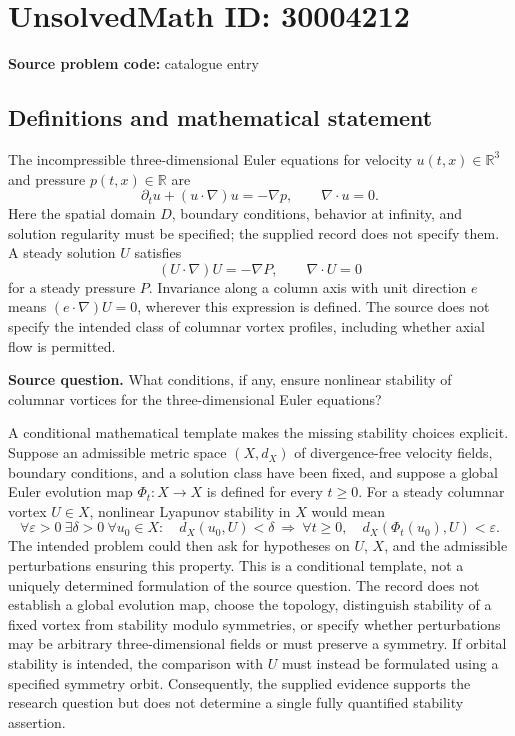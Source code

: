 \documentclass[11pt]{article}
\newcommand{\R}{\mathbb{R}}
\begin{document}
\section*{UnsolvedMath ID: 30004212}
\textbf{Source problem code:} catalogue entry
\subsection{Definitions and mathematical statement}
The incompressible three-dimensional Euler equations for velocity \(u(t,x)\in\R^3\) and pressure \(p(t,x)\in\R\) are
\[
\partial_tu+(u\cdot\nabla)u=-\nabla p,\qquad \nabla\cdot u=0.
\]
Here the spatial domain \(D\), boundary conditions, behavior at infinity, and solution regularity must be specified; the supplied record does not specify them. A steady solution \(U\) satisfies
\[
(U\cdot\nabla)U=-\nabla P,\qquad \nabla\cdot U=0
\]
for a steady pressure \(P\). Invariance along a column axis with unit direction \(e\) means \((e\cdot\nabla)U=0\), wherever this expression is defined. The source does not specify the intended class of columnar vortex profiles, including whether axial flow is permitted.

\textbf{Source question.} What conditions, if any, ensure nonlinear stability of columnar vortices for the three-dimensional Euler equations?

A conditional mathematical template makes the missing stability choices explicit. Suppose an admissible metric space \((X,d_X)\) of divergence-free velocity fields, boundary conditions, and a solution class have been fixed, and suppose a global Euler evolution map \(\Phi_t\colon X\to X\) is defined for every \(t\geq0\). For a steady columnar vortex \(U\in X\), nonlinear Lyapunov stability in \(X\) would mean
\[
\forall\varepsilon>0\ \exists\delta>0\ \forall u_0\in X:\quad
 d_X(u_0,U)<\delta
 \ \Longrightarrow\
 \forall t\geq0,\quad d_X(\Phi_t(u_0),U)<\varepsilon.
\]
The intended problem could then ask for hypotheses on \(U\), \(X\), and the admissible perturbations ensuring this property. This is a conditional template, not a uniquely determined formulation of the source question. The record does not establish a global evolution map, choose the topology, distinguish stability of a fixed vortex from stability modulo symmetries, or specify whether perturbations may be arbitrary three-dimensional fields or must preserve a symmetry. If orbital stability is intended, the comparison with \(U\) must instead be formulated using a specified symmetry orbit. Consequently, the supplied evidence supports the research question but does not determine a single fully quantified stability assertion.
\end{document}
